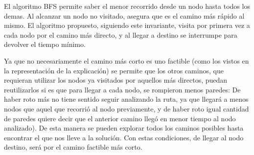 El algoritmo BFS permite saber el menor recorrido desde un nodo hasta todos los demas. Al alcanzar un nodo no visitado, asegura que es el camino más rápido al mismo. El algoritmo propuesto, siguiendo este invariante, visita por primera vez a cada nodo por el camino más directo, y al llegar a destino se interrumpe para devolver el tiempo mínimo.

Ya que no necesariamente el camino más corto es uno factible (como los vistos en la representación de la explicación) se permite que los otros caminos, que requieran utilizar los nodos ya visitados por aquellos más directos, puedan reutilizarlos si es que para llegar a cada nodo, se rompieron menos paredes: De haber roto más no tiene sentido seguir analizando la ruta, ya que llegará a menos nodos que aquel que recorrió al nodo previamente, y de haber roto igual cantidad de paredes quiere decir que el anterior camino llegó en menor tiempo al nodo analizado). De esta manera se pueden explorar todos los caminos posibles hasta encontrar el que nos lleve a la solución. Con estas condiciones, de llegar al nodo destino, será por el camino factible más corto.